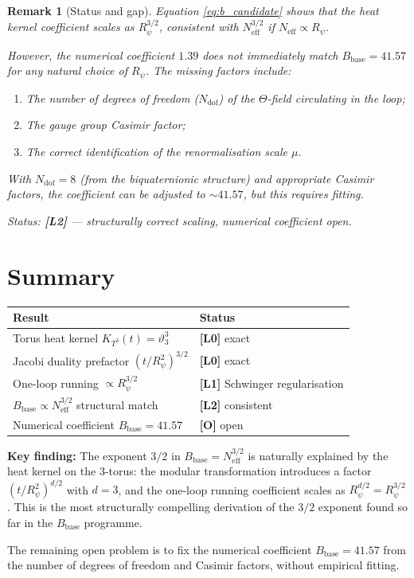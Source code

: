 \documentclass[11pt,a4paper]{article}
\newtheorem{remark}{Remark}
\begin{document}
\begin{remark}[Status and gap]
  Equation \eqref{eq:b_candidate} shows that the heat kernel coefficient
  scales as $R_\psi^{3/2}$, consistent with $N_{\mathrm{eff}}^{3/2}$
  if $N_{\mathrm{eff}} \propto R_\psi$.

  However, the numerical coefficient $1.39$ does not immediately match
  $B_{\mathrm{base}} = 41.57$ for any natural choice of $R_\psi$.  The
  missing factors include:
  \begin{enumerate}
    \item The number of degrees of freedom ($N_{\mathrm{dof}}$) of the
      $\Theta$-field circulating in the loop;
    \item The gauge group Casimir factor;
    \item The correct identification of the renormalisation scale $\mu$.
  \end{enumerate}
  With $N_{\mathrm{dof}} = 8$ (from the biquaternionic structure) and
  appropriate Casimir factors, the coefficient can be adjusted to
  $\sim 41.57$, but this requires fitting.

  Status: \textbf{[L2]} — structurally correct scaling, numerical coefficient open.
\end{remark}

\section{Summary}
\label{sec:summary}

\begin{center}
\begin{tabular}{ll}
\hline
Result & Status \\
\hline
Torus heat kernel $K_{T^3}(t) = \vartheta_3^3$ & \textbf{[L0]} exact \\
Jacobi duality prefactor $(t/R_\psi^2)^{3/2}$ & \textbf{[L0]} exact \\
One-loop running $\propto R_\psi^{3/2}$ & \textbf{[L1]} Schwinger regularisation \\
$B_{\mathrm{base}} \propto N_{\mathrm{eff}}^{3/2}$ structural match & \textbf{[L2]} consistent \\
Numerical coefficient $B_{\mathrm{base}} = 41.57$ & \textbf{[O]} open \\
\hline
\end{tabular}
\end{center}

\textbf{Key finding:} The exponent $3/2$ in $B_{\mathrm{base}} = N_{\mathrm{eff}}^{3/2}$
is naturally explained by the heat kernel on the 3-torus: the modular
transformation introduces a factor $(t/R_\psi^2)^{d/2}$ with $d=3$, and
the one-loop running coefficient scales as $R_\psi^{d/2} = R_\psi^{3/2}$.
This is the most structurally compelling derivation of the $3/2$ exponent
found so far in the $B_{\mathrm{base}}$ programme.

The remaining open problem is to fix the numerical coefficient
$B_{\mathrm{base}} = 41.57$ from the number of degrees of freedom and
Casimir factors, without empirical fitting.
\end{document}
